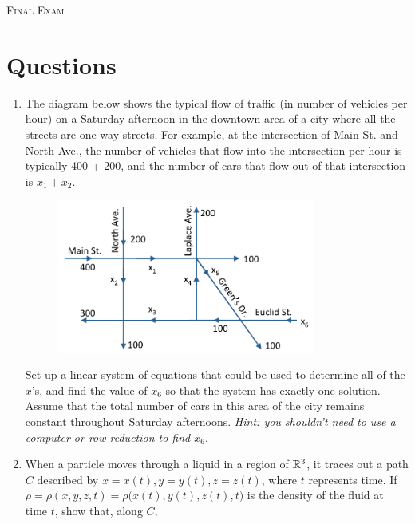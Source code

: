 \documentclass{article}
\date{}
\begin{document}
\begin{center}
\textsc{\LARGE Final Exam}\\[0.5cm]
\end{center}
\section*{Questions}

\begin{enumerate}
\item %
The diagram below shows the typical flow of traffic (in number of vehicles per hour) on a Saturday afternoon in the downtown area of a city where all the streets are one-way streets. For example, at the intersection of Main St. and North Ave., the number of vehicles that flow into the intersection per hour is typically 400 + 200, and the number of cars that flow out of that intersection is $x_1+x_2$. 
\begin{figure}[H]
  \vspace{-5pt}
  \begin{center}
    \includegraphics[width=0.8\textwidth]{Traffic.png}
  \end{center}
  \vspace{-20pt}
\end{figure}
Set up a linear system of equations that could be used to determine all of the $x$'s, and find the value of $x_6$ so that the system has exactly one solution. Assume that the total number of cars in this area of the city remains constant throughout Saturday afternoons. \textit{Hint: you shouldn't need to use a computer or row reduction to find $x_6$}.
\item %
When a particle moves through a liquid in a region of $\mathbb{R}^3$, it traces out a path $C$ described by $x=x(t), y=y(t), z=z(t)$, where $t$ represents time. If $\rho=\rho(x,y,z,t)=\rho\big(x(t),y(t),z(t),t\big)$ is the density of the fluid at time $t$, show that, along $C$,

\end{enumerate}
\end{document}
